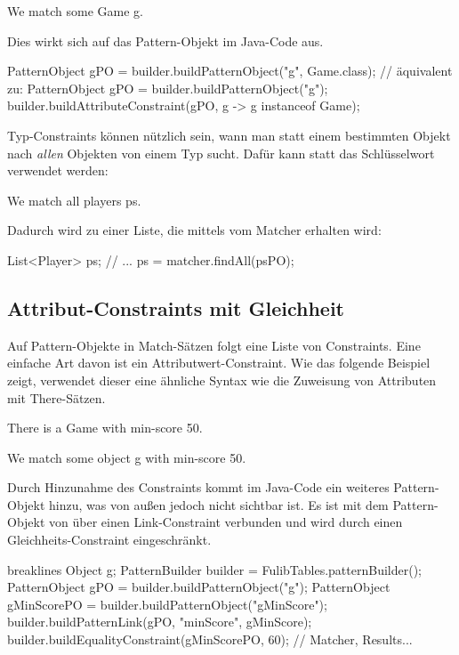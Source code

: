\begin{mdcodeblock}
    We match some Game g.
\end{mdcodeblock}

Dies wirkt sich auf das Pattern-Objekt im Java-Code aus.

\begin{jcodeblock}
    PatternObject gPO = builder.buildPatternObject("g", Game.class);
    // äquivalent zu:
    PatternObject gPO = builder.buildPatternObject("g");
    builder.buildAttributeConstraint(gPO, g -> g instanceof Game);
\end{jcodeblock}

Typ-Constraints können nützlich sein, wann man statt einem bestimmten Objekt nach \emph{allen} Objekten von einem Typ sucht.
Dafür kann statt  das Schlüsselwort  verwendet werden:

\begin{mdcodeblock}
    We match all players ps.
\end{mdcodeblock}

Dadurch wird  zu einer Liste, die mittels  vom Matcher erhalten wird:

\begin{jcodeblock}
    List<Player> ps;
    {
        // ...
        ps = matcher.findAll(psPO);
    }
\end{jcodeblock}

\subsection{Attribut-Constraints mit Gleichheit}

Auf Pattern-Objekte in Match-Sätzen folgt eine Liste von Constraints.
Eine einfache Art davon ist ein Attributwert-Constraint.
Wie das folgende Beispiel zeigt, verwendet dieser eine ähnliche Syntax wie die Zuweisung von Attributen mit There-Sätzen.

\begin{mdcodeblock}
    There is a Game with min-score 50.

    We match some object g with min-score 50.
\end{mdcodeblock}

Durch Hinzunahme des Constraints kommt im Java-Code ein weiteres Pattern-Objekt hinzu, was von außen jedoch nicht sichtbar ist.
Es ist mit dem Pattern-Objekt von  über einen Link-Constraint verbunden und wird durch einen Gleichheits-Constraint eingeschränkt.

\begin{jcodeblock*}{breaklines}
    Object g;
    {
        PatternBuilder builder = FulibTables.patternBuilder();
        PatternObject gPO = builder.buildPatternObject("g");
        PatternObject gMinScorePO = builder.buildPatternObject("gMinScore");
        builder.buildPatternLink(gPO, "minScore", gMinScore);
        builder.buildEqualityConstraint(gMinScorePO, 60);
        // Matcher, Results...
    }
\end{jcodeblock*}

